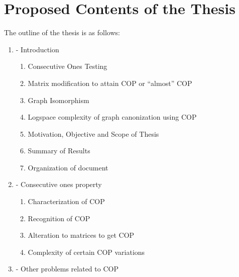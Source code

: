 \documentclass[MS,]{iitmdiss}
\begin{document}
\begin{singlespace}

{\footnotesize
   
  
}
\end{singlespace}




\chapter*{Proposed Contents of the Thesis}
The outline of the thesis is as follows:

\begin{enumerate}[{Chapter} 1]
\item - Introduction
  \begin{enumerate} [{Section 1.}1]
  \item Consecutive Ones Testing
  \item Matrix modification to attain COP or ``almost'' COP
  \item Graph Isomorphism
  \item Logspace complexity of graph canonization using COP
  \item Motivation, Objective and Scope of Thesis
  \item Summary of Results
  \item Organization of document
  \end{enumerate}

\item - Consecutive ones property %
  \begin{enumerate}[{Section 2.}1]
  \item Characterization of COP
  \item Recognition of COP
  \item Alteration to matrices to get COP
  \item Complexity of certain COP variations
  \end{enumerate}

\item - Other problems related to COP %


\end{enumerate}
\end{document}
